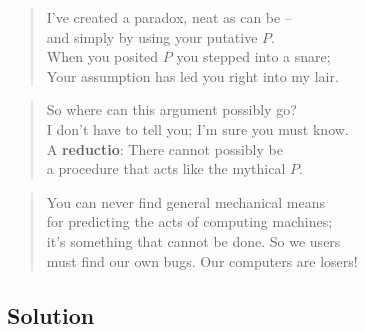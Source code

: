 \documentclass{article}
\begin{document}
\begin{verse}
I’ve created a paradox, neat as can be --\\
and simply by using your putative \(P\).\\
When you posited \(P\) you stepped into a snare;\\
Your assumption has led you right into my lair.
\end{verse}
\begin{verse}
So where can this argument possibly go?\\
I don't have to tell you; I'm sure you must know.\\
A \textbf{reductio}: There cannot possibly be\\
a procedure that acts like the mythical \(P\).
\end{verse}
\begin{verse}
You can never find general mechanical means\\
for predicting the acts of computing machines;\\
it's something that cannot be done. So we users\\
must find our own bugs. Our computers are losers!
\end{verse}

\subsection{Solution}
\end{document}
